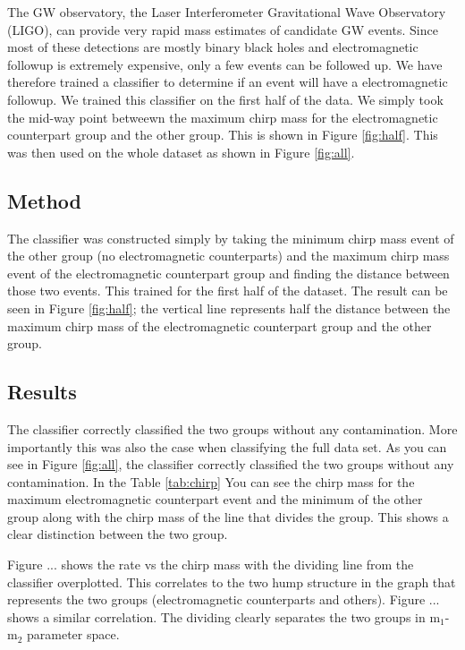 The GW observatory, the Laser Interferometer Gravitational Wave Observatory (LIGO), can provide very rapid mass estimates of candidate GW events. Since most of these detections are mostly binary black holes and electromagnetic followup is extremely expensive, only a few events can be followed up. We have therefore trained a classifier to determine if an event will have a electromagnetic followup. We trained this classifier on the first half of the data. We simply took the mid-way point betweewn the maximum chirp mass for the electromagnetic counterpart group and the other group. This is shown in Figure \ref{fig:half}. This was then used on the whole dataset as shown in Figure \ref{fig:all}.

\subsection{Method}
The classifier was constructed simply by taking the minimum chirp mass event of the other group (no electromagnetic counterparts) and the maximum chirp mass event of the electromagnetic counterpart group and finding the distance between those two events. This trained for the first half of the dataset. The result can be seen in Figure \ref{fig:half}; the vertical line represents half the distance between the maximum chirp mass of the electromagnetic counterpart group and the other group.

\subsection{Results}
The classifier correctly classified the two groups without any contamination. More importantly this was also the case when classifying the full data set. As you can see in Figure \ref{fig:all}, the classifier correctly classified the two groups without any contamination. In the Table \ref{tab:chirp} You can see the chirp mass for the maximum electromagnetic counterpart event and the minimum of the other group along with the chirp mass of the line that divides the group. This shows a clear distinction between the two group.



Figure ... shows the rate vs the chirp mass with the dividing line from the classifier overplotted. This correlates to the two hump structure in the graph that represents the two groups (electromagnetic counterparts and others). Figure ... shows a similar correlation. The dividing clearly separates the two groups in  m$_{1}$-m$_{2}$ parameter space.